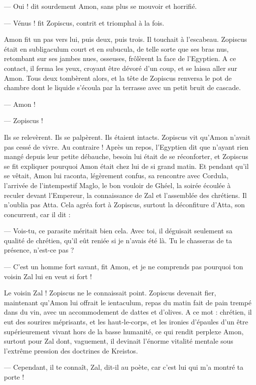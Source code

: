 \documentclass[a4paper, 11pt, oneside, polutonikogreek, french]{article}
\begin{document}
--- Oui ! dit sourdement Amon, sans plus se mouvoir et horrifié.

--- Vénus ! fit Zopiscus, contrit et triomphal à la fois.

Amon fit un pas vers lui, puis deux, puis trois. Il touchait à l'escabeau. Zopiscus était en subligaculum court et en subucula, de telle sorte que ses bras nus, retombant sur ses jambes nues, osseuses, frôlèrent la face de l'Egyptien. A ce contact, il ferma les yeux, croyant être dévoré d'un coup, et se laissa aller sur Amon. Tous deux tombèrent alors, et la tête de Zopiscus renversa le pot de chambre dont le liquide s'écoula par la terrasse avec un petit bruit de cascade.

--- Amon !

--- Zopiscus !

Ils se relevèrent. Ils se palpèrent. Ils étaient intacts. Zopiscus vit qu'Amon n'avait pas cessé de vivre. Au contraire ! Après un repos, l'Egyptien dit que n'ayant rien mangé depuis leur petite débauche, besoin lui était de se réconforter, et Zopiscus se fit expliquer pourquoi Amon était chez lui de si grand matin. Et pendant qu'il se vêtait, Amon lui raconta, légèrement confus, sa rencontre avec Cordula, l'arrivée de l'intempestif Maglo, le bon vouloir de Ghéel, la soirée écoulée à reculer devant l'Empereur, la connaissance de Zal et l'assemblée des chrétiens. Il n'oublia pas Atta. Cela agréa fort à Zopiscus, surtout la déconfiture d'Atta, son concurrent, car il dit :

--- Vois-tu, ce parasite méritait bien cela. Avec toi, il déguisait seulement sa qualité de chrétien, qu'il eût reniée si je n'avais été là. Tu le chasseras de ta présence, n'est-ce pas ?

--- C'est un homme fort savant, fit Amon, et je ne comprends pas pourquoi ton voisin Zal lui en veut si fort !

Le voisin Zal ! Zopiscus ne le connaissait point. Zopiscus devenait fier, maintenant qu'Amon lui offrait le ientaculum, repas du matin fait de pain trempé dans du vin, avec un accommodement de dattes et d'olives. A ce mot : chrétien, il eut des sourires méprisants, et les haut-le-corps, et les ironies d'épaules d'un être supérieurement vivant hors de la basse humanité, ce qui rendit perplexe Amon, surtout pour Zal dont, vaguement, il devinait l'énorme vitalité mentale sous l'extrême pression des doctrines de Kreistos.

--- Cependant, il te connaît, Zal, dit-il au poète, car c'est lui qui m'a montré ta porte !
\end{document}
